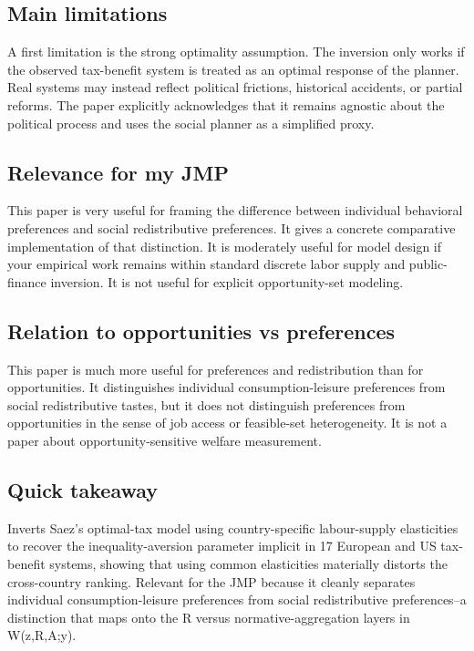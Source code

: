 \documentclass[11pt,a4paper]{article}
\begin{document}
\subsection*{Main limitations}
A first limitation is the strong optimality assumption. The inversion only works if the observed tax-benefit system is treated as an optimal response of the planner. Real systems may instead reflect political frictions, historical accidents, or partial reforms. The paper explicitly acknowledges that it remains agnostic about the political process and uses the social planner as a simplified proxy.

\subsection*{Relevance for my JMP}
This paper is very useful for framing the difference between individual behavioral preferences and social redistributive preferences. It gives a concrete comparative implementation of that distinction. It is moderately useful for model design if your empirical work remains within standard discrete labor supply and public-finance inversion. It is not useful for explicit opportunity-set modeling.

\subsection*{Relation to opportunities vs preferences}
This paper is much more useful for preferences and redistribution than for opportunities. It distinguishes individual consumption-leisure preferences from social redistributive tastes, but it does not distinguish preferences from opportunities in the sense of job access or feasible-set heterogeneity. It is not a paper about opportunity-sensitive welfare measurement.

\subsection*{Quick takeaway}
Inverts Saez's optimal-tax model using country-specific labour-supply elasticities to recover the inequality-aversion parameter implicit in 17 European and US tax-benefit systems, showing that using common elasticities materially distorts the cross-country ranking. Relevant for the JMP because it cleanly separates individual consumption-leisure preferences from social redistributive preferences--a distinction that maps onto the R versus normative-aggregation layers in W(z,R,A;y).
\end{document}
